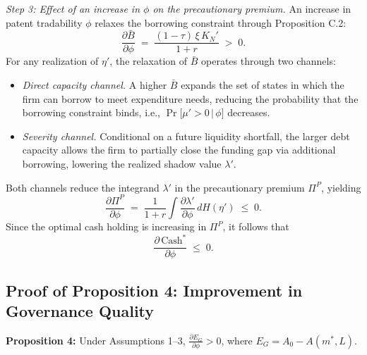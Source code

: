 \documentclass[12pt,a4paper]{article}
\begin{document}
\medskip
\noindent\textit{Step 3: Effect of an increase in $\phi$ on the precautionary premium.}\;
An increase in patent tradability $\phi$ relaxes the borrowing constraint through
Proposition C.2:
%
\[
  \frac{\partial\bar{B}}{\partial\phi}
  \;=\;
  \frac{(1-\tau)\,\xi\, K_{N}'}{1+r}\;>\;0.
\]
%
For any realization of $\eta'$, the relaxation of $\bar{B}$ operates through two channels:
%
\begin{itemize}
  \item \textit{Direct capacity channel.}\;
    A higher $\bar{B}$ expands the set of states in which the firm can borrow to
    meet expenditure needs, reducing the probability that the borrowing constraint
    binds, i.e.,
    $\Pr\!\bigl[\mu'>0\,\bigr|\,\phi\bigr]$ decreases.
  \item \textit{Severity channel.}\;
    Conditional on a future liquidity shortfall, the larger debt capacity allows
    the firm to partially close the funding gap via additional borrowing, lowering
    the realized shadow value $\lambda'$.
\end{itemize}
%
Both channels reduce the integrand $\lambda'$ in the precautionary premium
$\Pi^{P}$, yielding
%
\begin{equation}\tag{81b}
  \frac{\partial\Pi^{P}}{\partial\phi}
  \;=\;
  \frac{1}{1+r}\int\frac{\partial\lambda'}{\partial\phi}\,dH(\eta')
  \;\leq\; 0.
\end{equation}
%
Since the optimal cash holding is increasing in $\Pi^{P}$, it follows that
%
\begin{equation}\tag{81}
  \frac{\partial\,\text{Cash}^{*}}{\partial\phi}\;\leq\;0.
\end{equation}
%

\subsection{Proof of Proposition 4: Improvement in Governance Quality}
\textbf{Proposition 4:} Under Assumptions 1--3, $\frac{\partial E_G}{\partial \phi} > 0$, where $E_G = A_0 - A(m^*, L)$.
\end{document}
